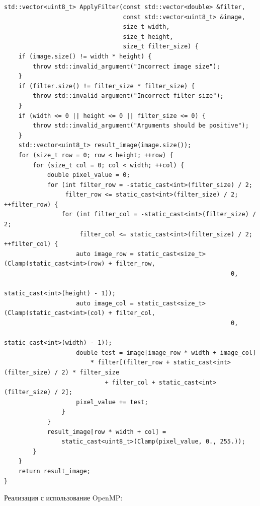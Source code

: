 \documentclass{report}
\begin{document}
\begin{lstlisting}[breaklines=true]
std::vector<uint8_t> ApplyFilter(const std::vector<double> &filter,
                                 const std::vector<uint8_t> &image,
                                 size_t width,
                                 size_t height,
                                 size_t filter_size) {
    if (image.size() != width * height) {
        throw std::invalid_argument("Incorrect image size");
    }
    if (filter.size() != filter_size * filter_size) {
        throw std::invalid_argument("Incorrect filter size");
    }
    if (width <= 0 || height <= 0 || filter_size <= 0) {
        throw std::invalid_argument("Arguments should be positive");
    }
    std::vector<uint8_t> result_image(image.size());
    for (size_t row = 0; row < height; ++row) {
        for (size_t col = 0; col < width; ++col) {
            double pixel_value = 0;
            for (int filter_row = -static_cast<int>(filter_size) / 2;
                 filter_row <= static_cast<int>(filter_size) / 2; ++filter_row) {
                for (int filter_col = -static_cast<int>(filter_size) / 2;
                     filter_col <= static_cast<int>(filter_size) / 2; ++filter_col) {
                    auto image_row = static_cast<size_t>(Clamp(static_cast<int>(row) + filter_row,
                                                               0,
                                                               static_cast<int>(height) - 1));
                    auto image_col = static_cast<size_t>(Clamp(static_cast<int>(col) + filter_col,
                                                               0,
                                                               static_cast<int>(width) - 1));
                    double test = image[image_row * width + image_col]
                        * filter[(filter_row + static_cast<int>(filter_size) / 2) * filter_size
                            + filter_col + static_cast<int>(filter_size) / 2];
                    pixel_value += test;
                }
            }
            result_image[row * width + col] =
                static_cast<uint8_t>(Clamp(pixel_value, 0., 255.));
        }
    }
    return result_image;
}

\end{lstlisting}

Реализация с использование OpenMP:
\end{document}
